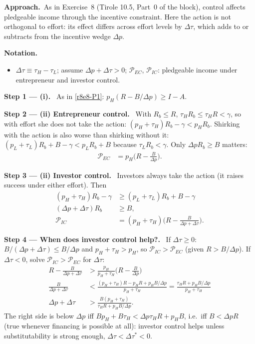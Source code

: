 \documentclass[11pt,a4paper]{article}
\newcommand{\notation}{\par\noindent\textbf{Notation.}}
\newcommand{\step}[2]{\par\medskip\noindent\textbf{Step #1 --- #2.}~}
\newcommand{\approach}{\par\smallskip\noindent\textbf{Approach.}~}
\newcommand{\dpp}{\Delta p}
\begin{document}
\approach As in Exercise~8 (Tirole 10.5, Part~0 of the block), control affects pledgeable income through the incentive constraint. Here the action is not orthogonal to effort: its effect differs across effort levels by $\Delta\tau$, which adds to or subtracts from the incentive wedge $\dpp$.

\notation
\begin{itemize}
  \item $\Delta\tau\equiv\tau_H-\tau_L$; assume $\dpp+\Delta\tau>0$; $\mathcal P_{EC}$, $\mathcal P_{IC}$: pledgeable income under entrepreneur and investor control.
\end{itemize}

\step{1}{(i)} As in \eqref{r8e8-P1}: $p_H(R-B/\dpp)\ge I-A$.

\step{2}{(ii) Entrepreneur control} With $R_b\le R$, $\tau_HR_b\le\tau_HR<\gamma$, so with effort she does not take the action: $(p_H+\tau_H)R_b-\gamma<p_HR_b$. Shirking with the action is also worse than shirking without it: $(p_L+\tau_L)R_b+B-\gamma<p_LR_b+B$ because $\tau_LR_b<\gamma$. Only $\dpp R_b\ge B$ matters:
\begin{align}
  \mathcal P_{EC} &= p_H\Big(R-\frac{B}{\dpp}\Big). \label{r8e10-PEC}
\end{align}

\step{3}{(ii) Investor control} Investors always take the action (it raises success under either effort). Then
\begin{align}
  (p_H+\tau_H)R_b-\gamma &\ge (p_L+\tau_L)R_b+B-\gamma \nonumber\\
  (\dpp+\Delta\tau)R_b &\ge B, \nonumber\\
  \mathcal P_{IC} &= (p_H+\tau_H)\Big(R-\frac{B}{\dpp+\Delta\tau}\Big). \label{r8e10-PIC}
\end{align}

\step{4}{When does investor control help?} If $\Delta\tau\ge0$: $B/(\dpp+\Delta\tau)\le B/\dpp$ and $p_H+\tau_H>p_H$, so $\mathcal P_{IC}>\mathcal P_{EC}$ (given $R>B/\dpp$). If $\Delta\tau<0$, solve $\mathcal P_{IC}>\mathcal P_{EC}$ for $\Delta\tau$:
\begin{align}
  R-\frac{B}{\dpp+\Delta\tau} &> \frac{p_H}{p_H+\tau_H}\Big(R-\frac{B}{\dpp}\Big) \nonumber\\
  \frac{B}{\dpp+\Delta\tau} &< \frac{(p_H+\tau_H)R-p_HR+p_HB/\dpp}{p_H+\tau_H}=\frac{\tau_HR+p_HB/\dpp}{p_H+\tau_H} \nonumber\\
  \dpp+\Delta\tau &> \frac{B(p_H+\tau_H)}{\tau_HR+p_HB/\dpp}. \label{r8e10-thr}
\end{align}
The right side is below $\dpp$ iff $Bp_H+B\tau_H<\dpp\tau_HR+p_HB$, i.e.\ iff $B<\dpp R$ (true whenever financing is possible at all): investor control helps unless substitutability is strong enough, $\Delta\tau<\Delta\tau^*<0$.
\end{document}
